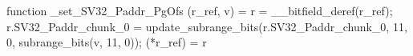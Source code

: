 function _set_SV32_Paddr_PgOfs (r_ref, v) = {
    r = __bitfield_deref(r_ref);
    r.SV32_Paddr_chunk_0 = update_subrange_bits(r.SV32_Paddr_chunk_0, 11, 0, subrange_bits(v, 11, 0));
    (*r_ref) = r
}

